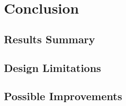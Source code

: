 
\section{Conclusion}
\label{sec:conclusion}

\subsection{Results Summary}



\subsection{Design Limitations}



\subsection{Possible Improvements}

